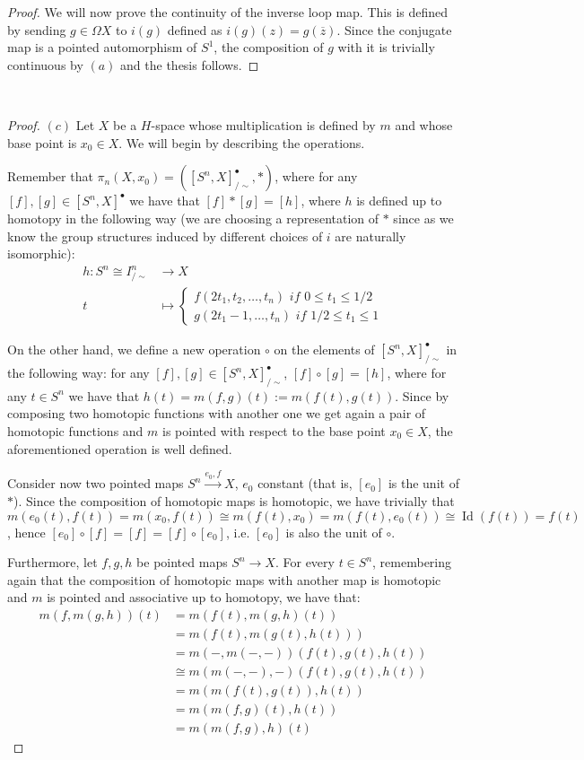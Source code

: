 \documentclass{article}
\DeclareMathOperator{\Id}{Id}
\begin{document}
\begin{proof}
	We will now prove the continuity of the inverse loop map. This is defined by sending $g\in\Omega X$ to $i(g)$ defined as $i(g)(z)=g(\overline{z})$. Since the conjugate map is a pointed automorphism of $S^1$, the composition of $g$ with it is trivially continuous by $(a)$ and the thesis follows.
\end{proof}

~\\
\begin{proof}
	$(c)$ Let $X$ be a $H$-space whose multiplication is defined by $m$ and whose base point is $x_0\in X$. We will begin by describing the operations.
	
	Remember that $\pi_n(X,x_0)=([S^n,X]^{\bullet}_{/\sim},*)$, where for any $[f],[g]\in [S^n,X]^{\bullet}$ we have that $[f]*[g]=[h]$, where $h$ is defined up to homotopy in the following way (we are choosing a representation of $*$ since as we know the group structures induced by different choices of $i$ are naturally isomorphic):
	\begin{align*}
		h: S^n\cong I^n_{/\sim} &\rightarrow X \\
		t &\mapsto\begin{cases}
			f(2t_1,t_2,\ldots,t_n)\textit{ if }0\leq t_1\leq 1/2 \\
			g(2t_1-1,\ldots,t_n)\textit{ if }1/2\leq t_1\leq 1
		\end{cases}
	\end{align*}
	
	On the other hand, we define a new operation $\circ$ on the elements of $[S^n,X]^{\bullet}_{/\sim}$ in the following way: for any $[f],[g]\in [S^n,X]^{\bullet}_{/\sim}$, $[f]\circ [g]=[h]$, where for any $t\in S^n$ we have that $h(t)=m(f,g)(t):=m(f(t),g(t))$. Since by composing two homotopic functions with another one we get again a pair of homotopic functions and $m$ is pointed with respect to the base point $x_0\in X$, the aforementioned operation is well defined.
	
	Consider now two pointed maps $S^n\xrightarrow{e_0,f} X$, $e_0$ constant (that is, $[e_0]$ is the unit of $*$). Since the composition of homotopic maps is homotopic, we have trivially that $m(e_0(t),f(t))=m(x_0,f(t))\cong m(f(t),x_0)=m(f(t),e_0(t))\cong\Id(f(t))=f(t)$, hence $[e_0]\circ [f]=[f]=[f]\circ [e_0]$, i.e. $[e_0]$ is also the unit of $\circ$.
	
	Furthermore, let $f,g,h$ be pointed maps $S^n\rightarrow X$. For every $t\in S^n$, remembering again that the composition of homotopic maps with another map is homotopic and $m$ is pointed and associative up to homotopy, we have that:
	\begin{align*}
		m(f,m(g,h))(t) &=m(f(t),m(g,h)(t)) \\
		&=m(f(t),m(g(t),h(t))) \\
		&=m(-,m(-,-))(f(t),g(t),h(t)) \\
		&\cong m(m(-,-),-)(f(t),g(t),h(t)) \\
		&=m(m(f(t),g(t)),h(t)) \\
		&=m(m(f,g)(t),h(t)) \\
		&=m(m(f,g),h)(t)
	\end{align*}
	

\end{proof}
\end{document}
